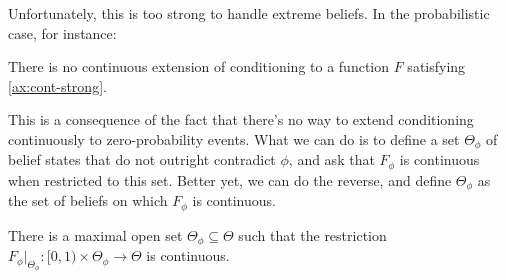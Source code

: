 Unfortunately, this is too strong to handle extreme beliefs.
In the probabilistic case, for instance:


%
\begin{prop}
	There is no continuous extension of conditioning to a function
	$F$ satisfying \cref{ax:cont-strong}.
\end{prop}
This is a consequence of the fact that there's no way to extend
conditioning continuously to zero-probability events. 
What we can do is to define a set $\Theta_\phi$ of belief states that do not
outright contradict $\phi$, and ask that $F_\phi$ is continuous when 
restricted to this set. 
Better yet, we can do the reverse, and define $\Theta_\phi$ as the set
of beliefs on which $F_\phi$ is continuous.

\begin{prop}
	There is a maximal open set $\Theta_\phi \subseteq \Theta$ such that
	the restriction $F_{\phi} |_{\Theta_\phi} : [0,1) \times \Theta_\phi \to \Theta$
	is continuous. 	
\end{prop}

